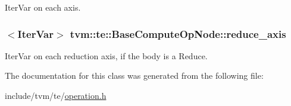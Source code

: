 Iter\+Var on each axis. 

\subsubsection[{\texorpdfstring{reduce\+\_\+axis}{reduce_axis}}]{$<${\bf Iter\+Var}$>$ tvm\+::te\+::\+Base\+Compute\+Op\+Node\+::reduce\+\_\+axis}\hypertarget{classtvm_1_1te_1_1BaseComputeOpNode_ad0df643468fc148d80afd7116abdd2ac}{}\label{classtvm_1_1te_1_1BaseComputeOpNode_ad0df643468fc148d80afd7116abdd2ac}


Iter\+Var on each reduction axis, if the body is a Reduce. 



The documentation for this class was generated from the following file\+:\begin{DoxyCompactItemize}
\item 
include/tvm/te/\hyperlink{operation_8h}{operation.\+h}\end{DoxyCompactItemize}
